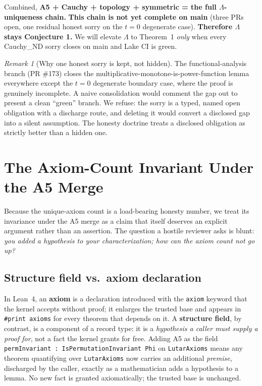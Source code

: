\documentclass[11pt]{article}
\theoremstyle{plain}
\theoremstyle{definition}
\theoremstyle{remark}
\newtheorem{remark}[theorem]{Remark}
\newcommand{\La}{\Lambda}
\begin{document}
Combined, \textbf{A5 + Cauchy + topology + symmetric = the full $\La$-uniqueness
chain.} \textbf{This chain is not yet complete on main} (three PRs open, one residual
honest sorry on the $t=0$ degenerate case). \textbf{Therefore $\La$ stays Conjecture
1.} We will elevate $\La$ to Theorem~1 \emph{only} when every Cauchy\_ND sorry closes
on main and Lake CI is green.

\begin{remark}[Why one honest sorry is kept, not hidden]
The functional-analysis branch (PR \#173) closes the
multiplicative-monotone-is-power-function lemma everywhere except the $t=0$
degenerate boundary case, where the proof is genuinely incomplete. A naive
consolidation would comment the gap out to present a clean ``green'' branch. We
refuse: the sorry is a typed, named open obligation with a discharge route, and
deleting it would convert a disclosed gap into a silent assumption. The honesty
doctrine treats a disclosed obligation as strictly better than a hidden one.
\end{remark}

\section{The Axiom-Count Invariant Under the A5 Merge}

Because the unique-axiom count is a load-bearing honesty number, we treat its
invariance under the A5 merge as a claim that itself deserves an explicit argument
rather than an assertion. The question a hostile reviewer asks is blunt: \emph{you
added a hypothesis to your characterization; how can the axiom count not go up?}

\subsection{Structure field vs.\ axiom declaration}
In Lean~4, an \textbf{axiom} is a declaration introduced with the \texttt{axiom}
keyword that the kernel accepts without proof; it enlarges the trusted base and
appears in \texttt{\#print axioms} for every theorem that depends on it. A
\textbf{structure field}, by contrast, is a component of a record type: it is a
\emph{hypothesis a caller must supply a proof for}, not a fact the kernel grants for
free. Adding A5 as the field \texttt{permInvariant : IsPermutationInvariant Phi} on
\texttt{LutarAxioms} means any theorem quantifying over \texttt{LutarAxioms} now
carries an additional \emph{premise}, discharged by the caller, exactly as a
mathematician adds a hypothesis to a lemma. No new fact is granted axiomatically; the
trusted base is unchanged.
\end{document}
